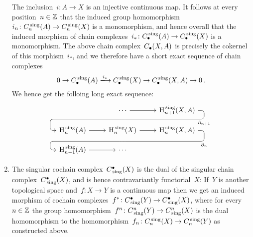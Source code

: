 \begin{example}
\begin{enumerate}
      The inclusion~$i \colon A \to X$ is an injective continuous map.
      It follows at every position~$n \in \mathbb{Z}$ that the induced group homomorphism~$i_n \colon C^{\,\mathrm{sing}}_n(A) \to C^{\,\mathrm{sing}}_n(X)$ is a monomorphism, and hence overall that the induced morphism of chain complexes~$i_* \colon C_\bullet^{\,\mathrm{sing}}(A) \to C_\bullet^{\,\mathrm{sing}}(X)$ is a monomorphism.
      The above chain complex~$C_\bullet(X,A)$ is precisely the cokernel of this morphism~$i_*$, and we therefore have a short exact sequence of chain complexes
      \begin{equation}
        \label{ses of singular cc}
        0
        \to
        \Ccc^\sing(A)
        \xlongto{i_*}
        \Ccc^\sing(X)
        \to 
        \Ccc^\sing(X,A)
        \to
        0 \,.
      \end{equation}
      We hence get the folloing long exact sequence:
      \[
        \begin{tikzcd}[row sep = small]
            {}
          & \dotsb
            \arrow{r}
            \arrow[d, phantom, ""{coordinate, name=Y}]
          & \Hl_{n+1}^\sing(X,A)
            \arrow[ dll,
                    "\del_{n+1}",
                    rounded corners,
                    to path={ -- ([xshift=2ex]\tikztostart.east)
                              |- (Y) \tikztonodes
                              -| ([xshift=-2ex]\tikztotarget.west)
                              -- (\tikztotarget)}
                  ]
          \\
            \Hl_n^\sing(A)
            \arrow{r}
          & \Hl_n^\sing(X)
            \arrow{r}
            \arrow[d, phantom, ""{coordinate, name=Z}]
          & \Hl_n^\sing(X,A)
            \arrow[ dll,
                    "\del_n",
                    rounded corners,
                    to path={ -- ([xshift=2ex]\tikztostart.east)
                              |- (Z) \tikztonodes
                              -| ([xshift=-2ex]\tikztotarget.west)
                              -- (\tikztotarget)}
                  ]
          \\
            \Hl_{n-1}^\sing(A)
            \arrow{r}
          & \dotsb
          & {}
        \end{tikzcd}
      \]
    \item
      The singular cochain complex~$C^\bullet_{\,\mathrm{sing}}(X)$ is the dual of the singular chain complex~$C^\bullet_{\,\mathrm{sing}}(X)$, and is hence contravariantly functorial~$X$:
      If~$Y$ is another topological space and~$f \colon X \to Y$ is a continuous map then we get an induced morphism of cochain complexes~$f^* \colon C^\bullet_{\,\mathrm{sing}}(Y) \to C^\bullet_{\,\mathrm{sing}}(X)$, where for every~$n \in \mathbb{Z}$ the group homomorphism~$f^n \colon C^n_{\,\mathrm{sing}}(Y) \to C^n_{\,\mathrm{sing}}(X)$ is the dual homomorphism to the homomorphism~$f_n \colon C_n^{\,\mathrm{sing}}(X) \to C_n^{\,\mathrm{sing}}(Y)$ as constructed above.
      

\end{enumerate}
\end{example}

